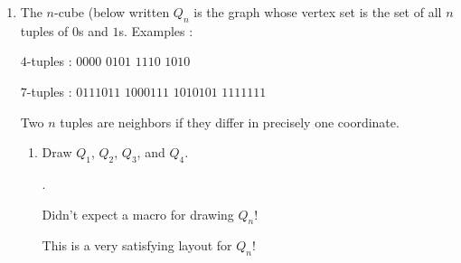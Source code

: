 \begin{enumerate}[leftmargin=*]
\begin{enumerate}
    \item $G$ is a tree IFF $G$ is acyclic and has exactly $n-1$ edges. 
\end{enumerate}
\item The $n$-cube (below written $Q_n$ is the graph whose vertex set is the set of all $n$ tuples of $0$s and $1$s. Examples : 
\begin{center}
$4$-tuples : 
\qquad
$0000$
\qquad
$0101$
\qquad
$1110$
\qquad
$1010$
\end{center}
\begin{center}
$7$-tuples : 
\qquad
$0111011$
\qquad
$1000111$
\qquad
$1010101$
\qquad
$1111111$
\end{center}
Two $n$ tuples are neighbors if they differ in precisely one coordinate. 
\begin{enumerate}
    \item Draw $Q_1$, $Q_2$, $Q_3$, and $Q_4$.
    \begin{solution}. 
    \begin{center}
    \begin{graphfig}{\themycounter{}}\end{graphfig}
    \begin{graphfig}{\themycounter{}}\end{graphfig}
    \begin{graphfig}{\themycounter{}}\end{graphfig}
    \begin{graphfig}{\themycounter{}}\end{graphfig}
    \end{center}
    \end{solution} \color{red} Didn't expect a macro for drawing $Q_n$! \color{black}

 \color{blue} This is a very satisfying layout for $Q_n$! \color{black}


\end{enumerate}
\end{enumerate}

